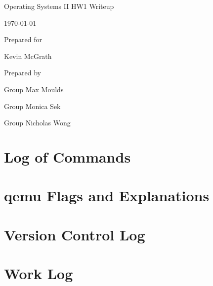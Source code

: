 \documentclass[onecolumn, draftclsnofoot,10pt, compsoc]{IEEEtran}
\def \GroupMemberOne{			Max Moulds}
\def \GroupMemberTwo{			Monica Sek}
\def \GroupMemberThree{			Nicholas Wong}
\def \ProfessorPerson{		Kevin McGrath}
\def \DocType{		HW1 Writeup
				}
\newcommand{\NameSigPair}[1]{\par
\makebox[2.75in][r]{#1} \hfil 	\makebox[3.25in]{\makebox[2.25in]{\hrulefill} \hfill		\makebox[.75in]{\hrulefill}}
\par\vspace{-12pt} \textit{\tiny\noindent
\makebox[2.75in]{} \hfil		\makebox[3.25in]{\makebox[2.25in][r]{Signature} \hfill	\makebox[.75in][r]{Date}}}}
\begin{document}
\begin{titlepage}
    \begin{singlespace}
        \hfill
        \par\vspace{.2in}
        \centering
        \scshape{
            \huge Operating Systems II \DocType \par
            {\large\today}\par
            \vspace{.5in}
            \vfill
            \vspace{5pt}
						{\large Prepared for }\par
						\ProfessorPerson\par
            {\large Prepared by }\par
            Group\GroupMemberOne\par
						Group\GroupMemberTwo\par
						Group\GroupMemberThree\par
            \vspace{5pt}
            \vspace{20pt}
        }
        \begin{abstract}
       		This document is the writeup for homework 1 of Operating Systems II Spring term 2018, written by group 20.
					\end{abstract}
    \end{singlespace}
\end{titlepage}
\newpage
{}
\tableofcontents
\clearpage

\section{Log of Commands}

\section{qemu Flags and Explanations}


\newpage
\section{Version Control Log}

\section{Work Log}
\end{document}
